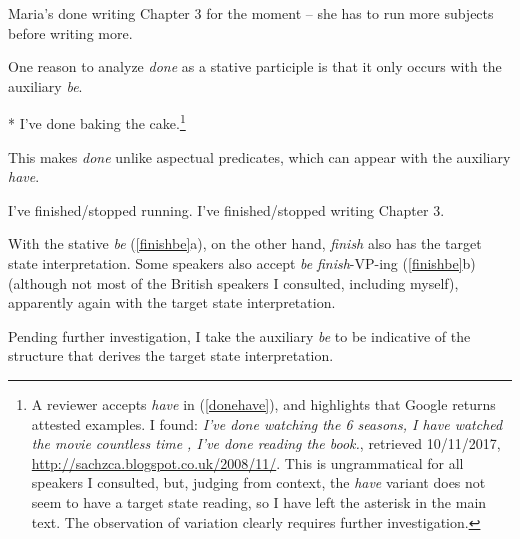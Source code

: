 \documentclass[output=paper,modfonts,nonflat]{langsci/langscibook}
\begin{document}
\begin{exe}
\ex\label{writeprog} Maria's done writing Chapter 3 for the moment -- she has to run more subjects before writing more.
\end{exe}

One reason to analyze \emph{done} as a stative participle is that it only
occurs with the auxiliary \emph{be}.

\begin{exe}
\ex\label{donehave} * I've done baking the cake.\footnote{A reviewer accepts \emph{have} in (\ref{donehave}), and highlights that Google returns attested examples. I found: \emph{I've done watching the 6 seasons, I have watched the movie countless time {\normalfont [sic.],} I've done reading the book.}, retrieved 10/11/2017, \url{http://sachzca.blogspot.co.uk/2008/11/}. This is ungrammatical for all speakers I consulted, but, judging from context, the \emph{have} variant does not seem to have a target state reading, so I have left the asterisk in the main text. The observation of variation clearly requires further investigation.}
\end{exe}

This makes \emph{done} unlike aspectual predicates, which can appear with the
auxiliary \emph{have}.

\begin{exe}
\ex\label{stop}
\begin{xlist}
\ex I've finished/stopped running.
\ex I've finished/stopped writing Chapter 3.
\end{xlist}
\end{exe}

With the stative \emph{be} (\ref{finishbe}a), on the other hand, \emph{finish}
also has the target state interpretation. Some speakers also accept \emph{be}
\emph{finish}-VP-ing (\ref{finishbe}b) (although not most of the British
speakers I consulted, including myself), apparently again with the target state
interpretation.

\begin{exe}
\ex\label{finishbe}
\begin{xlist}
\end{xlist}
\end{exe}

Pending further investigation, I take the auxiliary \emph{be} to be
indicative of the structure that derives the target state interpretation.
\end{document}
